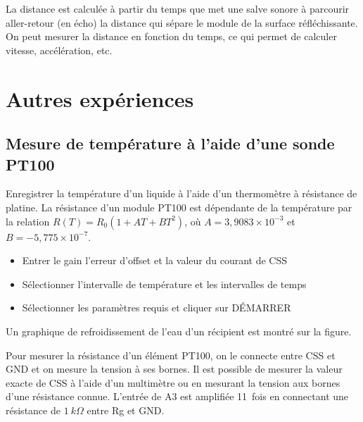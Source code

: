 \documentclass[a4paper,12pt,french]{sphinxmanual}
\let\sphinxpxdimen\pdfpxdimen\else\newdimen\sphinxpxdimen
\begin{document}

La distance est calculée à partir du temps que met une salve sonore à
parcourir aller-retour (en écho) la distance qui sépare le module de la
surface réfléchissante. On peut mesurer la distance en fonction du
temps, ce qui permet de calculer vitesse, accélération, etc.


\chapter{Autres expériences}
\label{\detokenize{index:autres-experiences}}

\section{Mesure de température à l’aide d’une sonde PT100}
\label{\detokenize{6.5:mesure-de-temperature-a-laide-dune-sonde-pt100}}\label{\detokenize{6.5::doc}}

Enregistrer la température d’un liquide à l’aide d’un thermomètre à
résistance de platine. La résistance d’un module PT100 est dépendante de
la température par la relation
\(R(T) = R_0 (1 + AT + BT^2)\), où
\(A = 3,9083 \times 10^{-3}\) et \(B =  - 5,775 \times 10^{-7}\).

\noindent\sphinxincludegraphics[width=300\sphinxpxdimen]{{pt100}.pdf}
\noindent\sphinxincludegraphics[width=300\sphinxpxdimen]{{pt100-screen}.pdf}

\begin{itemize}
\item {} 
Entrer le gain l’erreur d’offset et la valeur du courant de CSS

\item {} 
Sélectionner l’intervalle de température et les intervalles de temps

\item {} 
Sélectionner les paramètres requis et cliquer sur DÉMARRER

\end{itemize}


Un graphique de refroidissement de l’eau d’un récipient est montré sur
la figure.

Pour mesurer la résistance d’un élément PT100, on le connecte entre CSS
et GND et on mesure la tension à ses bornes. Il est possible de mesurer
la valeur exacte de CSS à l’aide d’un multimètre ou en mesurant la
tension aux bornes d’une résistance connue. L’entrée de A3 est amplifiée
11 fois en connectant une résistance de \(1~k\Omega\) entre Rg et GND.
\end{document}
